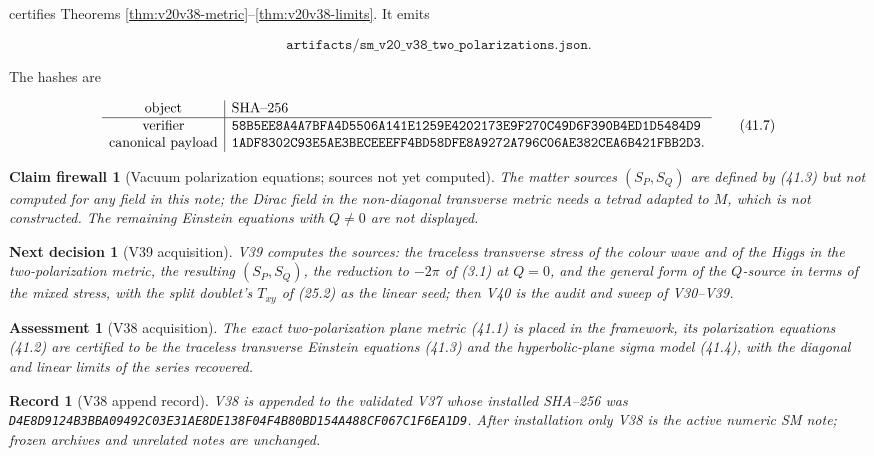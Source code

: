 \documentclass[11pt]{article}
\newtheorem{firewall}[theorem]{Claim firewall}
\newtheorem{decision}[theorem]{Next decision}
\newtheorem{assessment}[theorem]{Assessment}
\newtheorem{record}[theorem]{Record}
\theoremstyle{remark}
\begin{document}
certifies Theorems \ref{thm:v20v38-metric}--\ref{thm:v20v38-limits}.
It emits

\[
 \texttt{artifacts/sm\_v20\_v38\_two\_polarizations.json}.            \tag{41.6}
\]

The hashes are

\[
\begin{array}{c|l}
\hbox{object}&\hbox{SHA--256}\\ \hline
\hbox{verifier}&
\texttt{58B5EE8A4A7BFA4D5506A141E1259E4202173E9F270C49D6F390B4ED1D5484D9}\\
\hbox{canonical payload}&
\texttt{1ADF8302C93E5AE3BECEEEFF4BD58DFE8A9272A796C06AE382CEA6B421FBB2D3}.
\end{array}                                                     \tag{41.7}
\]

\begin{firewall}[Vacuum polarization equations; sources not yet computed]
\label{fire:v20v38}
The matter sources \((S_P,S_Q)\) are defined by (41.3) but not
computed for any field in this note; the Dirac field in the
non-diagonal transverse metric needs a tetrad adapted to \(M\), which
is not constructed.  The remaining Einstein equations with \(Q\neq0\)
are not displayed.
\end{firewall}

\begin{decision}[V39 acquisition]
\label{dec:v20v38-next}
V39 computes the sources: the traceless transverse stress of the
colour wave and of the Higgs in the two-polarization metric, the
resulting \((S_P,S_Q)\), the reduction to \(-2\pi\) of (3.1) at
\(Q=0\), and the general form of the \(Q\)-source in terms of the
mixed stress, with the split doublet's \(T_{xy}\) of (25.2) as the
linear seed; then V40 is the audit and sweep of V30--V39.
\end{decision}

\begin{assessment}[V38 acquisition]
\label{ass:v20v38}
The exact two-polarization plane metric (41.1) is placed in the
framework, its polarization equations (41.2) are certified to be the
traceless transverse Einstein equations (41.3) and the
hyperbolic-plane sigma model (41.4), with the diagonal and linear
limits of the series recovered.
\end{assessment}

\begin{record}[V38 append record]
\label{rec:v20v38}
V38 is appended to the validated V37 whose installed SHA--256 was
\texttt{D4E8D9124B3BBA09492C03E31AE8DE138F04F4B80BD154A488CF067C1F6EA1D9}.
After installation only V38 is the active numeric SM note; frozen
archives and unrelated notes are unchanged.
\end{record}
\end{document}
